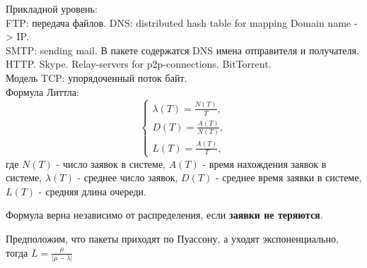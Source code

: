 \documentclass[11pt]{article}
\author{Sergey Makarov}
\date{\today}
\title{}
\begin{document}
Прикладной уровень: \\
FTP: передача файлов. DNS: distributed hash table for mapping Domain name -> IP. \\
SMTP: sending mail. В пакете содержатся DNS имена отправителя и получателя. \\
HTTP. Skype. Relay-servers for p2p-connections. BitTorrent. \\
Модель TCP: упорядоченный поток байт. \\

Формула Литтла:
\begin{equation}
\begin{cases}
\lambda(T) = \frac{N(T)}{T}, \\
D(T) = \frac{A(T)}{N(T)}, \\
L(T) = \frac{A(T)}T,
\end{cases}
\end{equation}
где $N(T)$ - число заявок в системе, $A(T)$ - время нахождения заявок в системе, $\lambda(T)$ - среднее число заявок, $D(T)$ - среднее время заявки в системе, $L(T)$ - средняя длина очереди.

Формула верна независимо от распределения, если \textbf{заявки не теряются}.

Предположим, что пакеты приходят по Пуассону, а уходят экспоненциально, тогда $L = \frac{\mu}{|\mu - \lambda|}$
\end{document}
